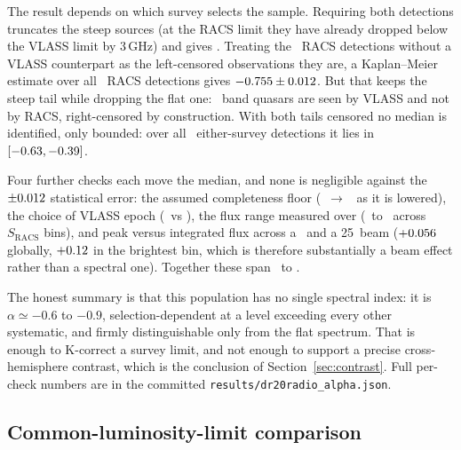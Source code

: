 \documentclass[twocolumn]{aastex631}
\newcommand{\code}[1]{\texttt{#1}}
\begin{document}
The result depends on which survey selects the sample. Requiring both detections truncates the steep sources
(at the RACS limit they have already dropped below the VLASS limit by 3\,GHz) and gives
\drAlphaJointMed. Treating the \drAlphaKmCens\ RACS detections without a VLASS counterpart as
the left-censored observations they are, a Kaplan--Meier estimate over all \drAlphaMeasN\
RACS detections gives $-0.755 \pm 0.012$. But that keeps the steep
tail while dropping the flat one: \drAlphaRightCens\ band quasars are seen by VLASS and not
by RACS, right-censored by construction. With both tails censored no median is identified,
only bounded: over all \drAlphaBoundN\ either-survey detections it lies in
$[-0.63, -0.39]$.

Four further checks each move the median, and none is negligible against the
$\pm0.012$ statistical error: the assumed completeness floor
(\drAlphaMeas\ $\to$ \drAlphaFloorC\ as it is lowered), the choice of VLASS epoch
(\drAlphaEpochA\ vs \drAlphaEpochB), the flux range measured over (\drAlphaBinFaint\ to
\drAlphaBinC\ across $S_\mathrm{RACS}$ bins), and peak versus integrated flux across a
\drAlphaVlassBeam\arcsec\ and a 25\arcsec\ beam ($+0.056$ globally, $+0.12$ in the
brightest bin, which is therefore substantially a beam effect rather than a spectral one).
Together these span \drAlphaSysLo\ to \drAlphaSysHi.

The honest summary is that this population has no single spectral index: it is
$\alpha \simeq -0.6$ to $-0.9$, selection-dependent at a level exceeding every other
systematic, and firmly distinguishable only from the flat spectrum. That is enough to
K-correct a survey limit, and not enough to support a precise cross-hemisphere contrast,
which is the conclusion of Section~\ref{sec:contrast}. Full per-check numbers are in the
committed \code{results/dr20radio\_alpha.json}.

\subsection{Common-luminosity-limit comparison}
\label{sec:method-lum}
\end{document}
